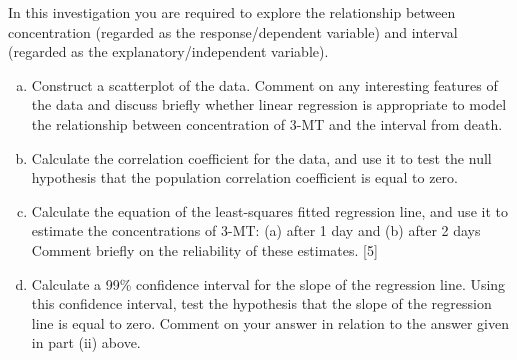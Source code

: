 \documentclass[a4paper,12pt]{article}
\begin{document}
\begin{enumerate}
In this investigation you are required to explore the relationship between
concentration (regarded as the response/dependent variable) and interval (regarded as the explanatory/independent variable).
\begin{enumerate}[(a)]
    \item  Construct a scatterplot of the data. Comment on any interesting features of the data and discuss briefly whether linear regression is appropriate to model the relationship between concentration of 3-MT and the interval from death.

    \item Calculate the correlation coefficient for the data, and use it to test the null
hypothesis that the population correlation coefficient is equal to zero.

    \item  Calculate the equation of the least-squares fitted regression line, and use it to
estimate the concentrations of 3-MT:
(a) after 1 day and
(b) after 2 days
Comment briefly on the reliability of these estimates. [5]
    \item Calculate a 99\% confidence interval for the slope of the regression line. Using this confidence interval, test the hypothesis that the slope of the regression line is equal to zero. Comment on your answer in relation to the answer given in
part (ii) above.
\end{enumerate}

\end{enumerate}
\newpage
\end{document}
